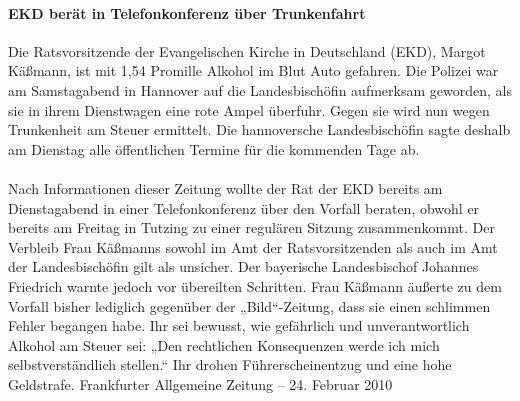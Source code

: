 \documentclass[a4paper,12pt,oneside]{scrbook}
\begin{document}
\paragraph{EKD berät in Telefonkonferenz über Trunkenfahrt}
Die Ratsvorsitzende der Evangelischen Kirche in Deutschland (EKD), Margot Käßmann, ist mit 1,54 Promille Alkohol im Blut Auto gefahren. Die Polizei war am Samstagabend in Hannover auf die Landesbischöfin aufmerksam geworden, als sie in ihrem Dienstwagen eine rote Ampel überfuhr. Gegen sie wird nun wegen Trunkenheit am Steuer ermittelt. Die hannoversche Landesbischöfin sagte deshalb am Dienstag alle öffentlichen Termine für die kommenden Tage ab.
\\\\
Nach Informationen dieser Zeitung wollte der Rat der EKD bereits am Dienstagabend in einer Telefonkonferenz über den Vorfall beraten, obwohl er bereits am Freitag in Tutzing zu einer regulären Sitzung zusammenkommt. Der Verbleib Frau Käßmanns sowohl im Amt der Ratsvorsitzenden als auch im Amt der Landesbischöfin gilt als unsicher. Der bayerische Landesbischof Johannes Friedrich warnte jedoch vor übereilten Schritten. Frau Käßmann äußerte zu dem Vorfall bisher lediglich gegenüber der „Bild“-Zeitung, dass sie einen schlimmen Fehler begangen habe. Ihr sei bewusst, wie gefährlich und unverantwortlich Alkohol am Steuer sei: „Den rechtlichen Konsequenzen werde ich mich selbstverständlich stellen.“ Ihr drohen Führerscheinentzug und eine hohe Geldstrafe.
\newpage
Frankfurter Allgemeine Zeitung \hfill -- \hfill 24. Februar 2010
\end{document}
